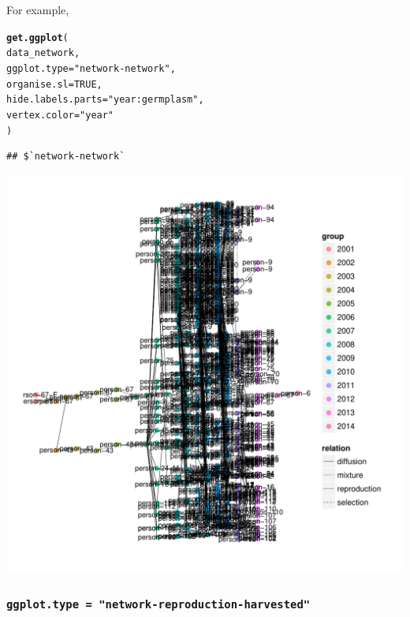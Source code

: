 \documentclass{article}\usepackage[]{graphicx}\usepackage[]{color}
\makeatletter
\def\maxwidth{ %
  \ifdim\Gin@nat@width>\linewidth
    \linewidth
  \else
    \Gin@nat@width
  \fi
}
\newcommand{\hlnum}[1]{\textcolor[rgb]{0.686,0.059,0.569}{#1}}%
\newcommand{\hlstr}[1]{\textcolor[rgb]{0.192,0.494,0.8}{#1}}%
\newcommand{\hlstd}[1]{\textcolor[rgb]{0.345,0.345,0.345}{#1}}%
\newcommand{\hlkwc}[1]{\textcolor[rgb]{0.333,0.667,0.333}{#1}}%
\newcommand{\hlkwd}[1]{\textcolor[rgb]{0.737,0.353,0.396}{\textbf{#1}}}%
\newenvironment{kframe}{%
 \def\at@end@of@kframe{}%
 \ifinner\ifhmode%
  \def\at@end@of@kframe{\end{minipage}}%
  \begin{minipage}{\columnwidth}%
 \fi\fi%
 \def\FrameCommand##1{\hskip\@totalleftmargin \hskip-\fboxsep
 \colorbox{shadecolor}{##1}\hskip-\fboxsep
     \hskip-\linewidth \hskip-\@totalleftmargin \hskip\columnwidth}%
 \MakeFramed {\advance\hsize-\width
   \@totalleftmargin\z@ \linewidth\hsize
   \@setminipage}}%
 {\par\unskip\endMakeFramed%
 \at@end@of@kframe}
\newenvironment{knitrout}{}{} %
\makeatother
\begin{document}
For example,

\begin{knitrout}
\color{fgcolor}\begin{kframe}
\begin{alltt}
\hlkwd{get.ggplot}\hlstd{(}
        \hlstd{data_network,}
        \hlkwc{ggplot.type} \hlstd{=} \hlstr{"network-network"}\hlstd{,}
        \hlkwc{organise.sl} \hlstd{=} \hlnum{TRUE}\hlstd{,}
        \hlkwc{hide.labels.parts} \hlstd{=} \hlstr{"year:germplasm"}\hlstd{,}
        \hlkwc{vertex.color} \hlstd{=} \hlstr{"year"}
        \hlstd{)}
\end{alltt}
\begin{verbatim}
## $`network-network`
\end{verbatim}
\end{kframe}


{\centering \includegraphics[width=\maxwidth]{figures/shinemas2R_unnamed-chunk-27-1} 

}



\end{knitrout}

\subsubsection{\texttt{ggplot.type = "network-reproduction-harvested"}}
\end{document}
